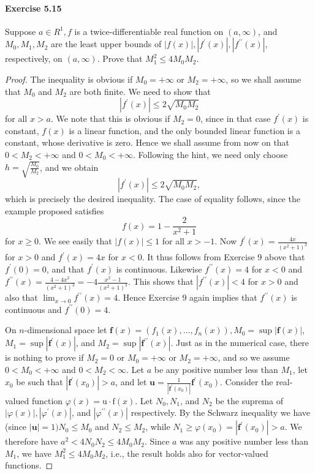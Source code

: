 \documentclass{article}
\theoremstyle{definition}
\begin{document}
\paragraph{Exercise 5.15} Suppose $a \in R^{1}, f$ is a twice-differentiable real function on $(a, \infty)$, and $M_{0}, M_{1}, M_{2}$ are the least upper bounds of $|f(x)|,\left|f^{\prime}(x)\right|,\left|f^{\prime \prime}(x)\right|$, respectively, on $(a, \infty)$. Prove that $M_{1}^{2} \leq 4 M_{0} M_{2} .$
\begin{proof}
    The inequality is obvious if $M_0=+\infty$ or $M_2=+\infty$, so we shall assume that $M_0$ and $M_2$ are both finite. We need to show that
$$
\left|f^{\prime}(x)\right| \leq 2 \sqrt{M_0 M_2}
$$
for all $x>a$. We note that this is obvious if $M_2=0$, since in that case $f^{\prime}(x)$ is constant, $f(x)$ is a linear function, and the only bounded linear function is a constant, whose derivative is zero. Hence we shall assume from now on that $0<M_2<+\infty$ and $0<M_0<+\infty$.
Following the hint, we need only choose $h=\sqrt{\frac{M_0}{M_2}}$, and we obtain
$$
\left|f^{\prime}(x)\right| \leq 2 \sqrt{M_0 M_2},
$$
which is precisely the desired inequality.
The case of equality follows, since the example proposed satisfies
$$
f(x)=1-\frac{2}{x^2+1}
$$
for $x \geq 0$. We see easily that $|f(x)| \leq 1$ for all $x>-1$. Now $f^{\prime}(x)=\frac{4 x}{\left(x^2+1\right)^2}$ for $x>0$ and $f^{\prime}(x)=4 x$ for $x<0$. It thus follows from Exercise 9 above that $f^{\prime}(0)=0$, and that $f^{\prime}(x)$ is continuous. Likewise $f^{\prime \prime}(x)=4$ for $x<0$ and $f^{\prime \prime}(x)=\frac{4-4 x^2}{\left(x^2+1\right)^3}=-4 \frac{x^2-1}{\left(x^2+1\right)^3}$. This shows that $\left|f^{\prime \prime}(x)\right|<4$ for $x>0$ and also that $\lim _{x \rightarrow 0} f^{\prime \prime}(x)=4$. Hence Exercise 9 again implies that $f^{\prime \prime}(x)$ is continuous and $f^{\prime \prime}(0)=4$.

On $n$-dimensional space let $\mathbf{f}(x)=\left(f_1(x), \ldots, f_n(x)\right), M_0=\sup |\mathbf{f}(x)|$, $M_1=\sup \left|\mathbf{f}^{\prime}(x)\right|$, and $M_2=\sup \left|\mathbf{f}^{\prime \prime}(x)\right|$. Just as in the numerical case, there is nothing to prove if $M_2=0$ or $M_0=+\infty$ or $M_2=+\infty$, and so we assume $0<M_0<+\infty$ and $0<M_2<\infty$. Let $a$ be any positive number less than $M_1$, let $x_0$ be such that $\left|\mathbf{f}^{\prime}\left(x_0\right)\right|>a$, and let $\mathbf{u}=\frac{1}{\left|\mathbf{f}^{\prime}\left(x_0\right)\right|} \mathbf{f}^{\prime}\left(x_0\right)$. Consider the real-valued function $\varphi(x)=\mathrm{u} \cdot \mathrm{f}(x)$. Let $N_0, N_1$, and $N_2$ be the suprema of $|\varphi(x)|,\left|\varphi^{\prime}(x)\right|$, and $\left|\varphi^{\prime \prime}(x)\right|$ respectively. By the Schwarz inequality we have (since $|\mathbf{u}|=1) N_0 \leq M_0$ and $N_2 \leq M_2$, while $N_1 \geq \varphi\left(x_0\right)=\left|\mathbf{f}^{\prime}\left(x_0\right)\right|>a$. We therefore have $a^2<4 N_0 N_2 \leq 4 M_0 M_2$. Since $a$ was any positive number less than $M_1$, we have $M_1^2 \leq 4 M_0 M_2$, i.e., the result holds also for vector-valued functions.


\end{proof}
\end{document}
